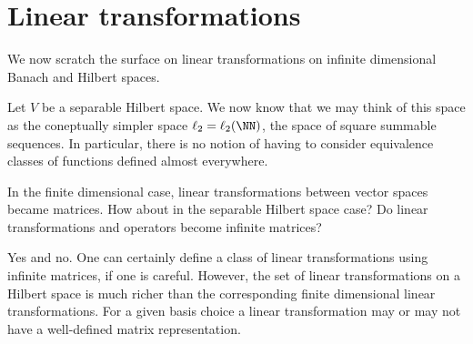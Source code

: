 


\section{Linear transformations}

We now scratch the surface on linear transformations on infinite dimensional Banach and Hilbert spaces.
    
Let $V$ be a separable Hilbert space. We now know that we may think of this space as the coneptually simpler space $\ell_2 = \ell_2(\NN)$, the space of square summable sequences. In particular, there is no notion of having to consider equivalence classes of functions defined almost everywhere.

In the finite dimensional case, linear transformations between vector spaces became matrices. How about in the separable Hilbert space case? Do linear transformations and operators become infinite matrices?

Yes and no. One can certainly define a class of linear transformations using infinite matrices, if one is careful. However, the set of linear transformations on a Hilbert space is much richer than the corresponding finite dimensional linear transformations. For a given basis choice a linear transformation may or may not have a well-defined matrix representation.


